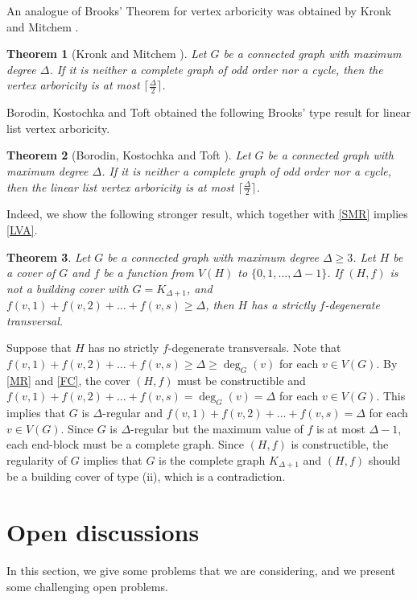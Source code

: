 \documentclass{article}
\makeatletter
\renewenvironment{proof}[1][\proofname]{\par
  \pushQED{\qed}%
  \normalfont \topsep6\p@\@plus6\p@\relax
  \trivlist
  \item[\hskip\labelsep
        \bfseries
    #1\@addpunct{.}]\ignorespaces
}{%
  \popQED\endtrivlist\@endpefalse
}
\newtheorem{theorem}{Theorem}[section]
\theoremstyle{definition}
\makeatother
\begin{document}
An analogue of Brooks' Theorem for vertex arboricity was obtained by Kronk and Mitchem \cite{MR0360334}. 
\begin{theorem}[Kronk and Mitchem \cite{MR0360334}]
Let $G$ be a connected graph with maximum degree $\Delta$. If it is neither a complete graph of odd order nor a cycle, then the vertex arboricity is at most $\lceil\frac{\Delta}{2} \rceil$. 
\end{theorem}

Borodin, Kostochka and Toft \cite{MR1743629} obtained the following Brooks' type result for linear list vertex arboricity. 
\begin{theorem}[Borodin, Kostochka and Toft \cite{MR1743629}]\label{LVA}
Let $G$ be a connected graph with maximum degree $\Delta$. If it is neither a complete graph of odd order nor a cycle, then the linear list vertex arboricity is at most $\lceil\frac{\Delta}{2} \rceil$. 
\end{theorem}
Indeed, we show the following stronger result, which together with \autoref{SMR} implies \autoref{LVA}. 
\begin{theorem}
Let $G$ be a connected graph with maximum degree $\Delta \geq 3$. Let $H$ be a cover of $G$ and $f$ be a function from $V(H)$ to $\{0, 1, \dots, \Delta -1\}$. If $(H, f)$ is not a building cover with $G = K_{\Delta + 1}$, and $f(v, 1) + f(v, 2) + \dots + f(v, s) \geq \Delta$, then $H$ has a strictly $f$-degenerate transversal. 
\end{theorem}

\begin{proof}
Suppose that $H$ has no strictly $f$-degenerate transversals. Note that $f(v, 1) + f(v, 2) + \dots + f(v, s) \geq \Delta \geq \deg_{G}(v)$ for each $v \in V(G)$. By \autoref{MR} and \autoref{FC}, the cover $(H, f)$ must be constructible and $f(v, 1) + f(v, 2) + \dots + f(v, s) = \deg_{G}(v) = \Delta$ for each $v \in V(G)$. This implies that $G$ is $\Delta$-regular and $f(v, 1) + f(v, 2) + \dots + f(v, s) = \Delta$ for each $v \in V(G)$. Since $G$ is $\Delta$-regular but the maximum value of $f$ is at most $\Delta - 1 $, each end-block must be a complete graph. Since $(H, f)$ is constructible, the regularity of $G$ implies that $G$ is the complete graph $K_{\Delta + 1}$ and $(H, f)$ should be a building cover of type (ii), which is a contradiction. 
\end{proof}

\section{Open discussions}
In this section, we give some problems that we are considering, and we present some challenging open problems. 
\end{document}
